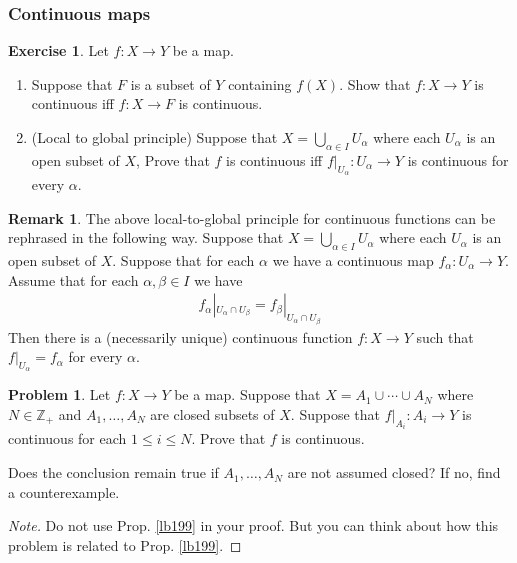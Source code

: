 \documentclass[12pt,b5paper,notitlepage]{article}
\theoremstyle{definition}
\newtheorem{exe}[df]{Exercise}
\newtheorem{rem}[df]{Remark}
\newtheorem{prob}{\color{red}Problem}[section]
\theoremstyle{plain}
\newcommand{\Zbb}{\mathbb Z}
\numberwithin{equation}{section}
\begin{document}
\subsubsection{Continuous maps}


\begin{exe}\label{lb184}
Let $f:X\rightarrow Y$ be a map.
\begin{enumerate}
\item Suppose that $F$ is a subset of $Y$ containing $f(X)$. Show that $f:X\rightarrow Y$ is continuous iff $f:X\rightarrow F$ is continuous.
\item (Local to global principle) Suppose that $X=\bigcup_{\alpha\in I}U_\alpha$ where each $U_\alpha$ is an open subset of $X$, Prove that $f$ is continuous iff $f|_{U_\alpha}:U_\alpha\rightarrow Y$ is continuous for every $\alpha$. 
\end{enumerate}
\end{exe}

\begin{rem}\label{lb205}
The above local-to-global principle for continuous functions can be rephrased in the following way. Suppose that $X=\bigcup_{\alpha\in I}U_\alpha$ where each $U_\alpha$ is an open subset of $X$. Suppose that for each $\alpha$ we have a continuous map $f_\alpha:U_\alpha\rightarrow Y$. Assume that for each $\alpha,\beta\in I$ we have
\begin{align*}
f_\alpha|_{U_\alpha\cap U_\beta}=f_\beta|_{U_\alpha\cap U_\beta}
\end{align*}
Then there is a (necessarily unique) continuous function $f:X\rightarrow Y$ such that $f|_{U_\alpha}=f_\alpha$ for every $\alpha$.
\end{rem}



\begin{prob}
Let $f:X\rightarrow Y$ be a map. Suppose that $X=A_1\cup\cdots \cup A_N$ where $N\in\Zbb_+$ and $A_1,\dots,A_N$ are closed subsets of $X$. Suppose that $f|_{A_i}:A_i\rightarrow Y$ is continuous for each $1\leq i\leq N$. Prove that $f$ is continuous. 

Does the conclusion remain true if $A_1,\dots,A_N$ are not assumed closed? If no, find a counterexample.  \hfill\qedsymbol
\end{prob}

\begin{proof}[Note]
Do not use Prop. \ref{lb199} in your proof. But you can think about how this problem is related to Prop. \ref{lb199}.
\end{proof}
\end{document}
